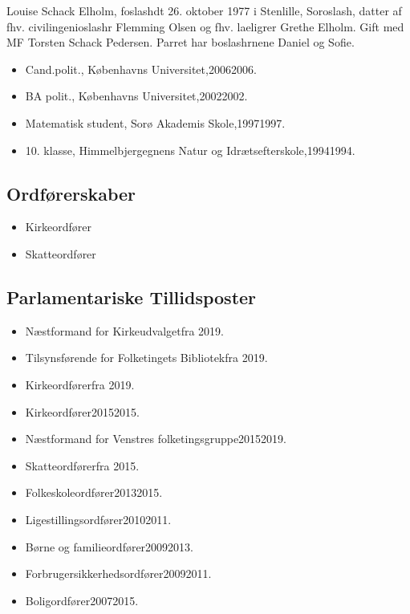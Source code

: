 \documentclass[11pt, a4paper]{awesome-cv}
\begin{document}
\makecvheader[R]
\makelettertitle
\begin{cvletter}
Louise Schack Elholm, foslashdt 26. oktober 1977 i Stenlille, Soroslash, datter af fhv. civilingenioslashr Flemming Olsen og fhv. laeligrer Grethe Elholm. Gift med MF Torsten Schack Pedersen. Parret har boslashrnene Daniel og Sofie.

\begin{itemize}
\item Cand.polit., Københavns Universitet,20062006.
\item BA polit., Københavns Universitet,20022002.
\item Matematisk student, Sorø Akademis Skole,19971997.
\item 10. klasse, Himmelbjergegnens Natur og Idrætsefterskole,19941994.
\end{itemize}
\subsection*{Ordførerskaber}
\begin{itemize}
\item Kirkeordfører
\item Skatteordfører
\end{itemize}
\subsection*{Parlamentariske Tillidsposter}
\begin{itemize}
\item Næstformand for Kirkeudvalgetfra 2019.
\item Tilsynsførende for Folketingets Bibliotekfra 2019.
\item Kirkeordførerfra 2019.
\item Kirkeordfører20152015.
\item Næstformand for Venstres folketingsgruppe20152019.
\item Skatteordførerfra 2015.
\item Folkeskoleordfører20132015.
\item Ligestillingsordfører20102011.
\item Børne og familieordfører20092013.
\item Forbrugersikkerhedsordfører20092011.
\item Boligordfører20072015.
\end{itemize}

\end{cvletter}
\end{document}
